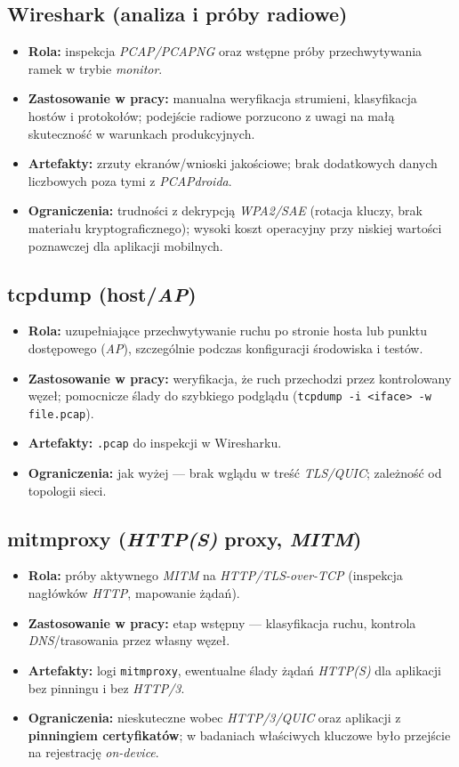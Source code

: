 \subsection*{Wireshark (analiza i próby radiowe)}
\begin{itemize}
  \item \textbf{Rola:} inspekcja \emph{PCAP/PCAPNG} oraz wstępne próby przechwytywania ramek w trybie \emph{monitor}.
  \item \textbf{Zastosowanie w pracy:} manualna weryfikacja strumieni, klasyfikacja hostów i protokołów; podejście radiowe porzucono z uwagi na małą skuteczność w warunkach produkcyjnych.
  \item \textbf{Artefakty:} zrzuty ekranów/wnioski jakościowe; brak dodatkowych danych liczbowych poza tymi z \emph{PCAPdroida}.
  \item \textbf{Ograniczenia:} trudności z dekrypcją \emph{WPA2/SAE} (rotacja kluczy, brak materiału kryptograficznego); wysoki koszt operacyjny przy niskiej wartości poznawczej dla aplikacji mobilnych.
\end{itemize}

\subsection*{tcpdump (host/\emph{AP})}
\begin{itemize}
  \item \textbf{Rola:} uzupełniające przechwytywanie ruchu po stronie hosta lub punktu dostępowego (\emph{AP}), szczególnie podczas konfiguracji środowiska i testów.
  \item \textbf{Zastosowanie w pracy:} weryfikacja, że ruch przechodzi przez kontrolowany węzeł; pomocnicze ślady do szybkiego podglądu (\texttt{tcpdump -i <iface> -w file.pcap}).
  \item \textbf{Artefakty:} \texttt{.pcap} do inspekcji w Wiresharku.
  \item \textbf{Ograniczenia:} jak wyżej — brak wglądu w treść \emph{TLS/QUIC}; zależność od topologii sieci.
\end{itemize}

\subsection*{mitmproxy (\emph{HTTP(S)} proxy, \emph{MITM})}
\begin{itemize}
  \item \textbf{Rola:} próby aktywnego \emph{MITM} na \emph{HTTP/TLS-over-TCP} (inspekcja nagłówków \emph{HTTP}, mapowanie żądań).
  \item \textbf{Zastosowanie w pracy:} etap wstępny — klasyfikacja ruchu, kontrola \emph{DNS}/trasowania przez własny węzeł.
  \item \textbf{Artefakty:} logi \texttt{mitmproxy}, ewentualne ślady żądań \emph{HTTP(S)} dla aplikacji bez pinningu i bez \emph{HTTP/3}.
  \item \textbf{Ograniczenia:} nieskuteczne wobec \emph{HTTP/3/QUIC} oraz aplikacji z \textbf{pinningiem certyfikatów}; w badaniach właściwych kluczowe było przejście na rejestrację \emph{on-device}.
\end{itemize}

